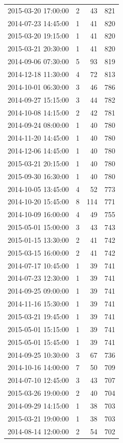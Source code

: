 \begin{tabular}{lrrr}
2015-03-20 17:00:00 & 2 & 43 & 821 \\
2014-07-23 14:45:00 & 1 & 41 & 820 \\
2015-03-20 19:15:00 & 1 & 41 & 820 \\
2015-03-21 20:30:00 & 1 & 41 & 820 \\
2014-09-06 07:30:00 & 5 & 93 & 819 \\
2014-12-18 11:30:00 & 4 & 72 & 813 \\
2014-10-01 06:30:00 & 3 & 46 & 786 \\
2014-09-27 15:15:00 & 3 & 44 & 782 \\
2014-10-08 14:15:00 & 2 & 42 & 781 \\
2014-09-24 08:00:00 & 1 & 40 & 780 \\
2014-11-20 14:45:00 & 1 & 40 & 780 \\
2014-12-06 14:45:00 & 1 & 40 & 780 \\
2015-03-21 20:15:00 & 1 & 40 & 780 \\
2015-09-30 16:30:00 & 1 & 40 & 780 \\
2014-10-05 13:45:00 & 4 & 52 & 773 \\
2014-10-20 15:45:00 & 8 & 114 & 771 \\
2014-10-09 16:00:00 & 4 & 49 & 755 \\
2015-05-01 15:00:00 & 3 & 43 & 743 \\
2015-01-15 13:30:00 & 2 & 41 & 742 \\
2015-03-15 16:00:00 & 2 & 41 & 742 \\
2014-07-17 10:45:00 & 1 & 39 & 741 \\
2014-07-23 12:30:00 & 1 & 39 & 741 \\
2014-09-25 09:00:00 & 1 & 39 & 741 \\
2014-11-16 15:30:00 & 1 & 39 & 741 \\
2015-03-21 19:45:00 & 1 & 39 & 741 \\
2015-05-01 15:15:00 & 1 & 39 & 741 \\
2015-05-01 15:45:00 & 1 & 39 & 741 \\
2014-09-25 10:30:00 & 3 & 67 & 736 \\
2014-10-16 14:00:00 & 7 & 50 & 709 \\
2014-07-10 12:45:00 & 3 & 43 & 707 \\
2015-03-26 19:00:00 & 2 & 40 & 704 \\
2014-09-29 14:15:00 & 1 & 38 & 703 \\
2015-03-21 19:00:00 & 1 & 38 & 703 \\
2014-08-14 12:00:00 & 2 & 54 & 702 \\

\end{tabular}
